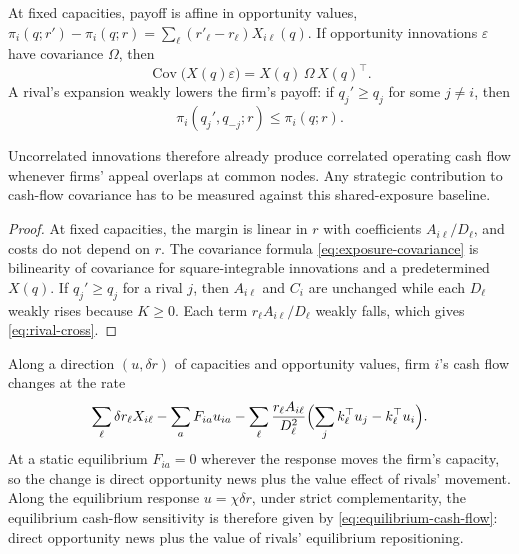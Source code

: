 \begin{corollary}\label{cor:exposure}
  At fixed capacities, payoff is affine in opportunity values,
  $\pi_i(q;r')-\pi_i(q;r)=\sum_\ell(r'_\ell-r_\ell)X_{i\ell}(q)$.
  If opportunity innovations $\varepsilon$ have covariance $\Omega$, then
  \begin{equation}\label{eq:exposure-covariance}
    \operatorname{Cov}\bigl(X(q)\varepsilon\bigr)=X(q)\,\Omega\,X(q)^\top.
  \end{equation}
  A rival's expansion weakly lowers the firm's payoff: if $q_j'\geq q_j$ for
  some $j\neq i$, then
  \begin{equation}\label{eq:rival-cross}
    \pi_i(q_j',q_{-j};r)\leq\pi_i(q;r).
  \end{equation}
\end{corollary}

Uncorrelated innovations therefore already produce correlated operating
cash flow whenever firms' appeal overlaps at common nodes.
Any strategic contribution to cash-flow covariance has to be measured
against this shared-exposure baseline.

\begin{proof}
  At fixed capacities, the margin is linear in $r$ with coefficients
  $A_{i\ell}/D_\ell$, and costs do not depend on $r$.
  The covariance formula \eqref{eq:exposure-covariance} is bilinearity of
  covariance for square-integrable innovations and a predetermined $X(q)$.
  If $q_j'\geq q_j$ for a rival $j$, then $A_{i\ell}$ and $C_i$ are unchanged
  while each $D_\ell$ weakly rises because $K\geq0$.
  Each term $r_\ell A_{i\ell}/D_\ell$ weakly falls, which gives
  \eqref{eq:rival-cross}.
\end{proof}

\begin{remark}\label{rem:envelope}
  Along a direction $(u,\delta r)$ of capacities and opportunity
  values, firm $i$'s
  cash flow changes at the rate
  \begin{equation}\label{eq:envelope}
    \sum_\ell\delta r_\ell X_{i\ell}-\sum_a F_{ia}u_{ia}
    -\sum_\ell\frac{r_\ell A_{i\ell}}{D_\ell^2}\Bigl(\sum_{j}k_\ell^\top
    u_j-k_\ell^\top u_i\Bigr).
  \end{equation}
  At a static equilibrium $F_{ia}=0$ wherever the response moves the firm's
  capacity, so the change is direct opportunity news plus the value effect of
  rivals' movement.
  Along the equilibrium response $u=\chi\delta r$, under strict complementarity,
  the equilibrium cash-flow sensitivity is therefore
  given by \eqref{eq:equilibrium-cash-flow}:
  direct opportunity news plus the value of rivals' equilibrium repositioning.
\end{remark}

